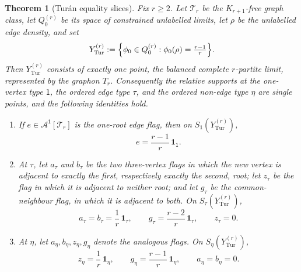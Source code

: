 \documentclass[11pt]{article}
\newtheorem{theorem}{Theorem}
\theoremstyle{definition}
\newcommand{\A}{\mathcal{A}}
\newcommand{\T}{\mathcal{T}}
\newcommand{\one}{\mathbf 1}
\newcommand{\vtype}{\mathsf{1}}
\begin{document}
\begin{theorem}[Tur\'an equality slices]\label{thm:turan-slice}
Fix $r\ge2$.  Let $\T_r$ be the $K_{r+1}$-free graph class, let $Q_0^{(r)}$ be its space
of constrained unlabelled limits, let $\rho$ be the unlabelled edge density, and set
\[
  Y_{\mathrm{Tur}}^{(r)}
  :=
  \Bigl\{\phi_0\in Q_0^{(r)}:\phi_0(\rho)=\tfrac{r-1}{r}\Bigr\}.
\]
Then $Y_{\mathrm{Tur}}^{(r)}$ consists of exactly one point, the balanced complete
$r$-partite limit, represented by the graphon $T_r$.  Consequently the relative supports
at the one-vertex type $\vtype$, the ordered edge type $\tau$, and the ordered non-edge
type $\eta$ are single points, and the following identities hold.
\begin{enumerate}[label=\textup{(\roman*)}, leftmargin=2.5em]
  \item If $e\in\A^{\vtype}[\T_r]$ is the one-root edge flag, then on
        $S_{\vtype}(Y_{\mathrm{Tur}}^{(r)})$,
        \[
          e=\frac{r-1}{r}\,\one_{\vtype} .
        \]
  \item At $\tau$, let $a_\tau$ and $b_\tau$ be the two three-vertex flags in which the
        new vertex is adjacent to exactly the first, respectively exactly the second,
        root; let $z_\tau$ be the flag in which it is adjacent to neither root; and let
        $g_\tau$ be the common-neighbour flag, in which it is adjacent to both.  On
        $S_\tau(Y_{\mathrm{Tur}}^{(r)})$,
        \[
          a_\tau=b_\tau=\frac1r\,\one_\tau,
          \qquad
          g_\tau=\frac{r-2}{r}\,\one_\tau,
          \qquad
          z_\tau=0 .
        \]
  \item At $\eta$, let $a_\eta,b_\eta,z_\eta,g_\eta$ denote the analogous flags.  On
        $S_\eta(Y_{\mathrm{Tur}}^{(r)})$,
        \[
          z_\eta=\frac1r\,\one_\eta,
          \qquad
          g_\eta=\frac{r-1}{r}\,\one_\eta,
          \qquad
          a_\eta=b_\eta=0 .
        \]
\end{enumerate}
\end{theorem}
\end{document}
